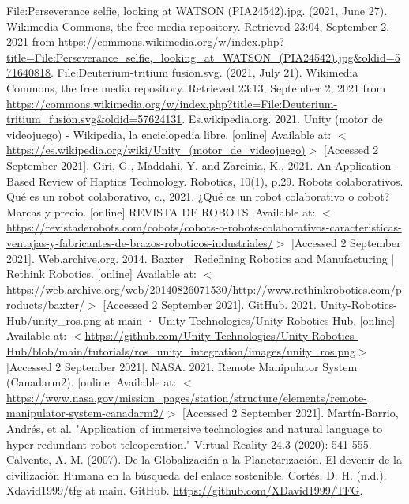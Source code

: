\begin{thebibliography}{2}
	 File:Perseverance selfie, looking at WATSON (PIA24542).jpg. (2021, June 27). Wikimedia Commons, the free media repository. Retrieved 23:04, September 2, 2021 from \url{https://commons.wikimedia.org/w/index.php?title=File:Perseverance\_selfie,\_looking\_at\_WATSON\_(PIA24542).jpg\&oldid=571640818}.
	 File:Deuterium-tritium fusion.svg. (2021, July 21). Wikimedia Commons, the free media repository. Retrieved 23:13, September 2, 2021 from \url{https://commons.wikimedia.org/w/index.php?title=File:Deuterium-tritium\_fusion.svg\&oldid=57624131}.
	 Es.wikipedia.org. 2021. Unity (motor de videojuego) - Wikipedia, la enciclopedia libre. [online] Available at: $<$\url{https://es.wikipedia.org/wiki/Unity\_(motor\_de\_videojuego)}$>$ [Accessed 2 September 2021].
	 Giri, G., Maddahi, Y. and Zareinia, K., 2021. An Application-Based Review of Haptics Technology. Robotics, 10(1), p.29.
	 Robots colaborativos. Qué es un robot colaborativo, c., 2021.  ¿Qué es un robot colaborativo o cobot? Marcas y precio. [online] REVISTA DE ROBOTS. Available at: $<$\href{https://revistaderobots.com/cobots/cobots-o-robots-colaborativos-caracteristicas-ventajas-y-fabricantes-de-brazos-roboticos-industriales/}{https://revistaderobots.com/cobots/cobots-o-robots-colaborativos-caracteristicas-ventajas-y-fabricantes-de-brazos-roboticos-industriales/}$>$ [Accessed 2 September 2021].
	 Web.archive.org. 2014. Baxter | Redefining Robotics and Manufacturing | Rethink Robotics. [online] Available at: $<$\url{https://web.archive.org/web/20140826071530/http://www.rethinkrobotics.com/products/baxter/}$>$ [Accessed 2 September 2021].
	 GitHub. 2021. Unity-Robotics-Hub/unity\_ros.png at main · Unity-Technologies/Unity-Robotics-Hub. [online] Available at: $<$\url{https://github.com/Unity-Technologies/Unity-Robotics-Hub/blob/main/tutorials/ros\_unity\_integration/images/unity\_ros.png}$>$ [Accessed 2 September 2021].
	 NASA. 2021. Remote Manipulator System (Canadarm2). [online] Available at: $<$\url{https://www.nasa.gov/mission\_pages/station/structure/elements/remote-manipulator-system-canadarm2/}$>$ [Accessed 2 September 2021].
	 Martín-Barrio, Andrés, et al. "Application of immersive technologies and natural language to hyper-redundant robot teleoperation." Virtual Reality 24.3 (2020): 541-555.
	 Calvente, A. M. (2007). De la Globalización a la Planetarización. El devenir de la civilización Humana en la búsqueda del enlace sostenible.
	 Cortés, D. H. (n.d.). Xdavid1999/tfg at main. GitHub. \url{https://github.com/XDavid1999/TFG}. 
\end{thebibliography}